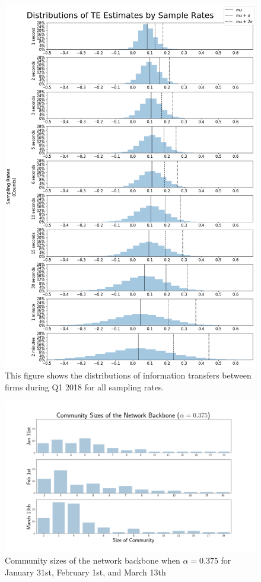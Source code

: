 \begin{figure}[htb!]
  \centerline{\includegraphics[scale=0.4]{figures/EarnAnnounceTE/TEDist.png}}
  \caption{This figure shows the distributions of information transfers between firms during Q1 2018 for all sampling rates.}
  \label{fig:TEDist}
\end{figure}

\begin{figure}
  \centerline{\includegraphics[scale=0.4]{figures/EarnAnnounceTE/NetworkBackboneCommunitySizes.png}}
  \caption{Community sizes of the network backbone when $\alpha=0.375$ for January 31st,  February 1st,  and March 13th}
  \label{fig:NetworkBackboneCommunitySizes}
\end{figure}

